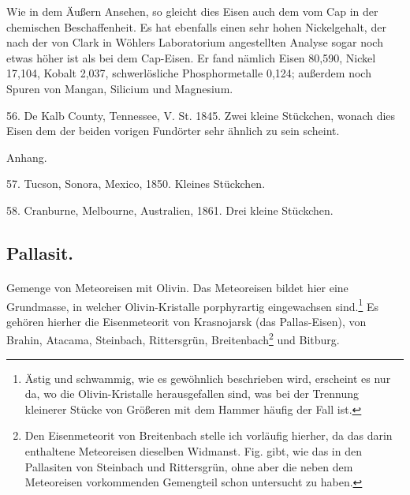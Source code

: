 \documentclass[a4paper, 11pt, oneside]{article}
\begin{document}
Wie in dem Äußern Ansehen, so gleicht dies Eisen auch dem vom Cap in der chemischen Beschaffenheit. Es hat ebenfalls einen sehr hohen Nickelgehalt, der nach der von Clark in Wöhlers Laboratorium angestellten Analyse sogar noch etwas höher ist als bei dem Cap-Eisen. Er fand nämlich Eisen 80,590, Nickel 17,104, Kobalt 2,037, schwerlösliche Phosphormetalle 0,124; außerdem noch Spuren von Mangan, Silicium und Magnesium.

56. De Kalb County, Tennessee, V. St. 1845. Zwei kleine Stückchen, wonach dies Eisen dem der beiden vorigen Fundörter sehr ähnlich zu sein scheint.

Anhang.

57. Tucson, Sonora, Mexico, 1850. Kleines Stückchen.

58. Cranburne, Melbourne, Australien, 1861. Drei kleine Stückchen.
\subsection{Pallasit.}
\paragraph{}
Gemenge von Meteoreisen mit Olivin. Das Meteoreisen bildet hier eine Grundmasse, in welcher Olivin-Kristalle porphyrartig eingewachsen sind.\footnote{Ästig und schwammig, wie es gewöhnlich beschrieben wird, erscheint es nur da, wo die Olivin-Kristalle herausgefallen sind, was bei der Trennung kleinerer Stücke von Größeren mit dem Hammer häufig der Fall ist.} Es gehören hierher die Eisenmeteorit von Krasnojarsk (das Pallas-Eisen), von Brahin, Atacama, Steinbach, Rittersgrün, Breitenbach\footnote{Den Eisenmeteorit von Breitenbach stelle ich vorläufig hierher, da das darin enthaltene Meteoreisen dieselben Widmanst. Fig. gibt, wie das in den Pallasiten von Steinbach und Rittersgrün, ohne aber die neben dem Meteoreisen vorkommenden Gemengteil schon untersucht zu haben.} und Bitburg.
\end{document}
